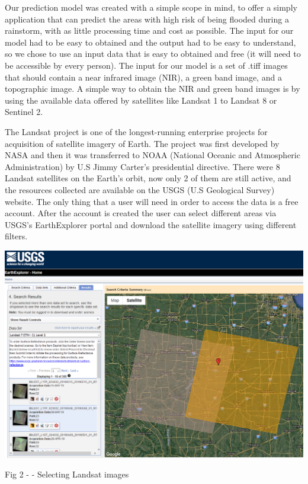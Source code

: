 \documentclass[12pt, a4paper]{report}
\begin{document}
\quad
Our prediction model was created with a simple scope in mind, to offer a simply  application that can predict the areas with high risk of being flooded during a rainstorm, with as little processing time and cost as possible. The input for our model had to be easy to obtained and the output had to be easy to understand, so we chose to use an input data that is easy to obtained and free (it will need to be accessible by every person). The input for our model is a set of .tiff images that should contain a near infrared image (NIR), a green band image, and a topographic image. A simple way to obtain the NIR and green band images is by using the available data offered by satellites like Landsat 1 to Landsat 8 or Sentinel 2. 

\par 
The Landsat project is one of the longest-running enterprise projects for acquisition of satellite imagery of Earth. The project was first developed by NASA and then it was transferred to NOAA (National Oceanic and Atmospheric Administration) by U.S Jimmy Carter's presidential directive. There were 8 Landsat satellites on the Earth's orbit, now only 2 of them are still active, and the resources collected are available on the USGS (U.S Geological Survey) website. The only thing that a user will need in order to access the data is a free account. After the account is created the user can select different areas via USGS's EarthExplorer portal and download the satellite imagery using different filters.
\par

\bigskip

\includegraphics[scale=0.5, right]{landsat_search.png} 
\begin{center}
Fig 2 - \cite{USGS} - Selecting Landsat images
\end{center}
\end{document}
